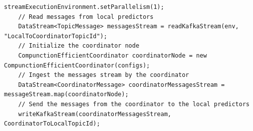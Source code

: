 \begin{lstlisting}[caption={The coordinator Flink program.},label={algonline:flink2},frame=single]
    streamExecutionEnvironment.setParallelism(1);
	// Read messages from local predictors
	DataStream<TopicMessage> messagesStream = readKafkaStream(env, "LocalToCoordinatorTopicId");	
	// Initialize the coordinator node
	CompunctionEfficientCoordinator coordinatorNode = new CompunctionEfficientCoordinator(configs);
	// Ingest the messages stream by the coordinator	
	DataStream<CoordinatorMessage> coordinatorMessagesStream = messageStream.map(coordinatorNode);	
	// Send the messages from the coordinator to the local predictors
	writeKafkaStream(coordinatorMessagesStream, CoordinatorToLocalTopicId);
\end{lstlisting}
       